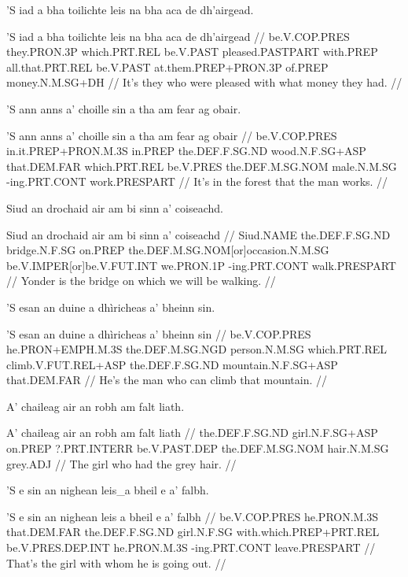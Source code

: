 \documentclass[a4paper,10pt]{article}
\begin{document}
\ex
\begingl
\glpre 'S iad a bha toilichte leis na bha aca de dh'airgead. 

\vspace{4mm}
\gla 'S iad a bha toilichte leis na bha aca de dh'airgead  //
\glb be.V.COP.PRES they.PRON.3P which.PRT.REL be.V.PAST pleased.PASTPART with.PREP all.that.PRT.REL be.V.PAST at.them.PREP+PRON.3P of.PREP money.N.M.SG+DH  //
\glft It's they who were pleased with what money they had. //
\endgl
\xe

\ex
\begingl
\glpre 'S ann anns a' choille sin a tha am fear ag obair. 

\vspace{4mm}
\gla 'S ann anns a' choille sin a tha am fear ag obair  //
\glb be.V.COP.PRES in.it.PREP+PRON.M.3S in.PREP the.DEF.F.SG.ND wood.N.F.SG+ASP that.DEM.FAR which.PRT.REL be.V.PRES the.DEF.M.SG.NOM male.N.M.SG -ing.PRT.CONT work.PRESPART  //
\glft It's in the forest that the man works. //
\endgl
\xe

\ex
\begingl
\glpre Siud an drochaid air am bi sinn a' coiseachd. 

\vspace{4mm}
\gla Siud an drochaid air am bi sinn a' coiseachd  //
\glb Siud.NAME the.DEF.F.SG.ND bridge.N.F.SG on.PREP the.DEF.M.SG.NOM[or]occasion.N.M.SG be.V.IMPER[or]be.V.FUT.INT we.PRON.1P -ing.PRT.CONT walk.PRESPART  //
\glft Yonder is the bridge on which we will be walking. //
\endgl
\xe

\ex
\begingl
\glpre 'S esan an duine a dhìricheas a' bheinn sin. 

\vspace{4mm}
\gla 'S esan an duine a dhìricheas a' bheinn sin  //
\glb be.V.COP.PRES he.PRON+EMPH.M.3S the.DEF.M.SG.NGD person.N.M.SG which.PRT.REL climb.V.FUT.REL+ASP the.DEF.F.SG.ND mountain.N.F.SG+ASP that.DEM.FAR  //
\glft He's the man who can climb that mountain. //
\endgl
\xe

\ex
\begingl
\glpre A' chaileag air an robh am falt liath. 

\vspace{4mm}
\gla A' chaileag air an robh am falt liath  //
\glb the.DEF.F.SG.ND girl.N.F.SG+ASP on.PREP ?.PRT.INTERR be.V.PAST.DEP the.DEF.M.SG.NOM hair.N.M.SG grey.ADJ  //
\glft The girl who had the grey hair. //
\endgl
\xe

\ex
\begingl
\glpre 'S e sin an nighean leis\_a bheil e a' falbh. 

\vspace{4mm}
\gla 'S e sin an nighean {leis a} bheil e a' falbh  //
\glb be.V.COP.PRES he.PRON.M.3S that.DEM.FAR the.DEF.F.SG.ND girl.N.F.SG with.which.PREP+PRT.REL be.V.PRES.DEP.INT he.PRON.M.3S -ing.PRT.CONT leave.PRESPART  //
\glft That's the girl with whom he is going out. //
\endgl
\xe
\end{document}
